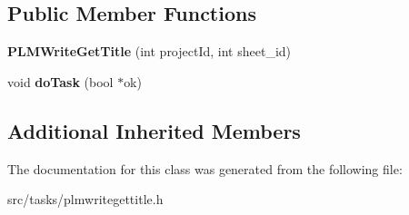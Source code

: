\subsection*{Public Member Functions}
\begin{DoxyCompactItemize}
\item 
{\bfseries P\+L\+M\+Write\+Get\+Title} (int project\+Id, int sheet\+\_\+id)\hypertarget{class_p_l_m_write_get_title_a8573ac331f139dc09aec755990049791}{}\label{class_p_l_m_write_get_title_a8573ac331f139dc09aec755990049791}

\item 
void {\bfseries do\+Task} (bool $\ast$ok)\hypertarget{class_p_l_m_write_get_title_a5d9f57a1b578b19735285b3d37f567bd}{}\label{class_p_l_m_write_get_title_a5d9f57a1b578b19735285b3d37f567bd}

\end{DoxyCompactItemize}
\subsection*{Additional Inherited Members}


The documentation for this class was generated from the following file\+:\begin{DoxyCompactItemize}
\item 
src/tasks/plmwritegettitle.\+h\end{DoxyCompactItemize}
